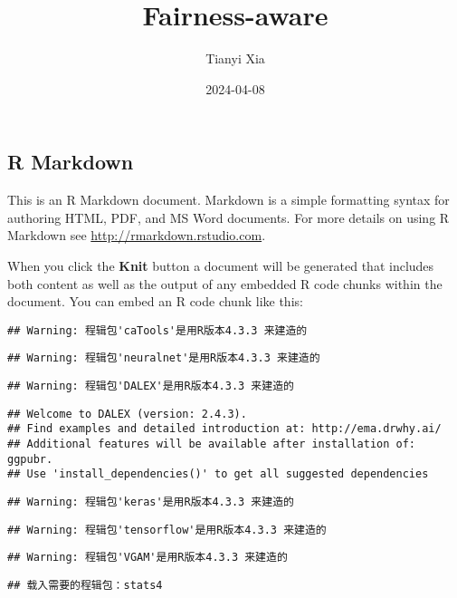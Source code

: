 \documentclass[
]{article}
\title{Fairness-aware}
\author{Tianyi Xia}
\date{2024-04-08}
\begin{document}
\maketitle

\hypertarget{r-markdown}{%
\subsection{R Markdown}\label{r-markdown}}

This is an R Markdown document. Markdown is a simple formatting syntax
for authoring HTML, PDF, and MS Word documents. For more details on
using R Markdown see \url{http://rmarkdown.rstudio.com}.

When you click the \textbf{Knit} button a document will be generated
that includes both content as well as the output of any embedded R code
chunks within the document. You can embed an R code chunk like this:

\begin{verbatim}
## Warning: 程辑包'caTools'是用R版本4.3.3 来建造的
\end{verbatim}

\begin{verbatim}
## Warning: 程辑包'neuralnet'是用R版本4.3.3 来建造的
\end{verbatim}

\begin{verbatim}
## Warning: 程辑包'DALEX'是用R版本4.3.3 来建造的
\end{verbatim}

\begin{verbatim}
## Welcome to DALEX (version: 2.4.3).
## Find examples and detailed introduction at: http://ema.drwhy.ai/
## Additional features will be available after installation of: ggpubr.
## Use 'install_dependencies()' to get all suggested dependencies
\end{verbatim}

\begin{verbatim}
## Warning: 程辑包'keras'是用R版本4.3.3 来建造的
\end{verbatim}

\begin{verbatim}
## Warning: 程辑包'tensorflow'是用R版本4.3.3 来建造的
\end{verbatim}

\begin{verbatim}
## Warning: 程辑包'VGAM'是用R版本4.3.3 来建造的
\end{verbatim}

\begin{verbatim}
## 载入需要的程辑包：stats4
\end{verbatim}
\end{document}
